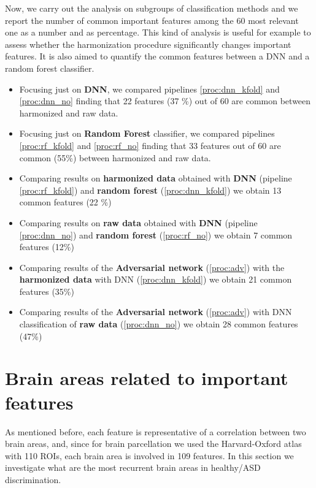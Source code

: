 \documentclass[11pt]{report}
\begin{document}
Now, we carry out the analysis on subgroups of classification methods and we report the number of common important features among the 60 most relevant one as a number and as percentage.
This kind of analysis is useful for example to assess whether the harmonization procedure significantly changes important features.
It is also aimed to quantify the common features between a DNN and a random forest classifier.

\begin{itemize}
\item Focusing just on \textbf{DNN}, we compared pipelines \ref{proc:dnn_kfold} and \ref{proc:dnn_no} finding that 22 features (37 \%) out of 60 are common between harmonized and raw data.

\item Focusing just on \textbf{Random Forest} classifier, we compared pipelines \ref{proc:rf_kfold} and \ref{proc:rf_no} finding that 33 features out of 60 are common (55\%) between harmonized and raw data.

\item Comparing results on  \textbf{harmonized data} obtained with \textbf{DNN} (pipeline \ref{proc:rf_kfold}) and \textbf{random forest} (\ref{proc:dnn_kfold}) we obtain 13 common features (22 \%)

\item Comparing results on \textbf{raw data} obtained with \textbf{DNN} (pipeline \ref{proc:dnn_no}) and \textbf{random forest} (\ref{proc:rf_no}) we obtain 7 common features  (12\%)

\item Comparing results of the \textbf{Adversarial network} (\ref{proc:adv}) with the \textbf{harmonized data} with DNN (\ref{proc:dnn_kfold}) we obtain 21 common features (35\%)

\item Comparing results of the \textbf{Adversarial network} (\ref{proc:adv}) with DNN classification of \textbf{raw data} (\ref{proc:dnn_no}) we obtain 28 common features (47\%)
\end{itemize}



\section{Brain areas related to important features}

As mentioned before, each feature is representative of a correlation between two brain areas, and, since for brain parcellation we used the Harvard-Oxford atlas with 110 ROIs, each brain area is involved in 109 features.
In this section we investigate what are the most recurrent brain areas in healthy/ASD discrimination.
\end{document}

